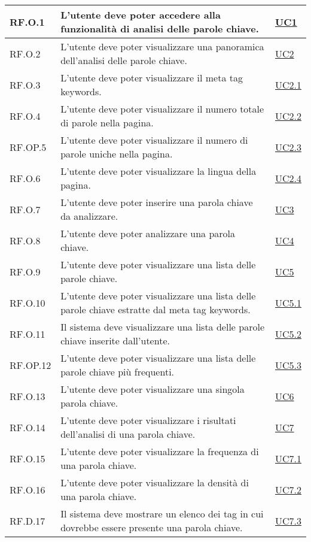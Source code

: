 \begin{longtable}{p{}p{}p{}}
\hline
RF.O.1 & L'utente deve poter accedere alla funzionalità di analisi delle parole chiave. & \hyperref[UC1]{UC1} \\
\hline
RF.O.2 & L'utente deve poter visualizzare una panoramica dell'analisi delle parole chiave. & \hyperref[UC2]{UC2} \\
\hline
RF.O.3 & L'utente deve poter visualizzare il meta tag keywords. & \hyperref[UC2point1]{UC2.1} \\
\hline
RF.O.4 & L'utente deve poter visualizzare il numero totale di parole nella pagina. & \hyperref[UC2point2]{UC2.2} \\
\hline
RF.OP.5 & L'utente deve poter visualizzare il numero di parole uniche nella pagina. & \hyperref[UC2point3]{UC2.3} \\
\hline
RF.O.6 & L'utente deve poter visualizzare la lingua della pagina. & \hyperref[UC2point4]{UC2.4} \\
\hline
RF.O.7 & L'utente deve poter inserire una parola chiave da analizzare. & \hyperref[UC3]{UC3} \\
\hline
RF.O.8 & L'utente deve poter analizzare una parola chiave. & \hyperref[UC4]{UC4} \\
\hline
RF.O.9 & L'utente deve poter visualizzare una lista delle parole chiave. & \hyperref[UC5]{UC5} \\
\hline
RF.O.10 & L'utente deve poter visualizzare una lista delle parole chiave estratte dal meta tag keywords. & \hyperref[UC5point1]{UC5.1} \\
\hline
RF.O.11 & Il sistema deve visualizzare una lista delle parole chiave inserite dall'utente. & \hyperref[UC5point2]{UC5.2} \\
\hline
RF.OP.12 & L'utente deve poter visualizzare una lista delle parole chiave più frequenti. & \hyperref[UC5point3]{UC5.3} \\
\hline
RF.O.13 & L'utente deve poter visualizzare una singola parola chiave. & \hyperref[UC6]{UC6} \\
\hline
RF.O.14 & L'utente deve poter visualizzare i risultati dell'analisi di una parola chiave. & \hyperref[UC7]{UC7} \\
\hline
RF.O.15 & L'utente deve poter visualizzare la frequenza di una parola chiave. & \hyperref[UC7point1]{UC7.1} \\
\hline
RF.O.16 & L'utente deve poter visualizzare la densità di una parola chiave. & \hyperref[UC7point2]{UC7.2} \\
\hline
RF.D.17 & Il sistema deve mostrare un elenco dei tag in cui dovrebbe essere presente una parola chiave. & \hyperref[UC7point3]{UC7.3} \\

\end{longtable}
